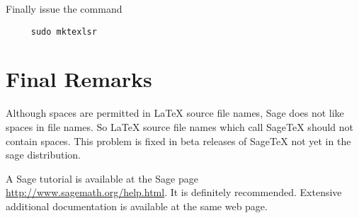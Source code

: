 \documentclass[11pt, oneside]{amsart}
\begin{document}
Finally issue the command
\begin{verbatim}		
     sudo mktexlsr
\end{verbatim}
	



\section{Final Remarks}
Although spaces are permitted in LaTeX source file names, Sage does not like spaces in file names. So LaTeX source file names which call SageTeX should not contain spaces. This problem is fixed in beta releases of SageTeX not yet in the sage distribution.

A Sage tutorial is available at the Sage page \url{http://www.sagemath.org/help.html}. It is definitely recommended. Extensive additional documentation is available at the same web page.
\end{document}
